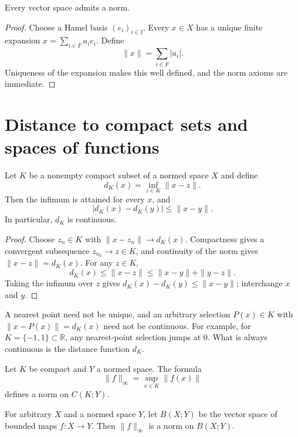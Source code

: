 \begin{notetheorem}
Every vector space admits a norm.
\end{notetheorem}

\begin{proof}
Choose a Hamel basis $(e_i)_{i\in I}$.  Every $x\in X$ has a unique finite
expansion $x=\sum_{i\in F}a_ie_i$.  Define
\[
  \|x\|=\sum_{i\in F}|a_i|.
\]
Uniqueness of the expansion makes this well defined, and the norm axioms are
immediate.
\end{proof}

\section{Distance to compact sets and spaces of functions}

\begin{noteproposition}
Let $K$ be a nonempty compact subset of a normed space $X$ and define
\[
  d_K(x)=\inf_{z\in K}\|x-z\|.
\]
Then the infimum is attained for every $x$, and
\[
  |d_K(x)-d_K(y)|\le\|x-y\|.
\]
In particular, $d_K$ is continuous.
\end{noteproposition}

\begin{proof}
Choose $z_n\in K$ with $\|x-z_n\|\to d_K(x)$.  Compactness gives a
convergent subsequence $z_{n_k}\to z\in K$, and continuity of the norm gives
$\|x-z\|=d_K(x)$.  For any $z\in K$,
\[
  d_K(x)\le\|x-z\|\le\|x-y\|+\|y-z\|.
\]
Taking the infimum over $z$ gives $d_K(x)-d_K(y)\le\|x-y\|$; interchange
$x$ and $y$.
\end{proof}

\begin{noteremark}
A nearest point need not be unique, and an arbitrary selection
$P(x)\in K$ with $\|x-P(x)\|=d_K(x)$ need not be continuous.  For example,
for $K=\{-1,1\}\subset\mathbb R$, any nearest-point selection jumps at
$0$.  What is always continuous is the distance function $d_K$.
\end{noteremark}

\begin{notetheorem}
Let $K$ be compact and $Y$ a normed space.  The formula
\[
  \|f\|_\infty=\sup_{x\in K}\|f(x)\|
\]
defines a norm on $C(K;Y)$.
\end{notetheorem}

\begin{notetheorem}
For arbitrary $X$ and a normed space $Y$, let $B(X;Y)$ be the vector space of
bounded maps $f\colon X\to Y$.  Then $\|f\|_\infty$ is a norm on
$B(X;Y)$.
\end{notetheorem}

